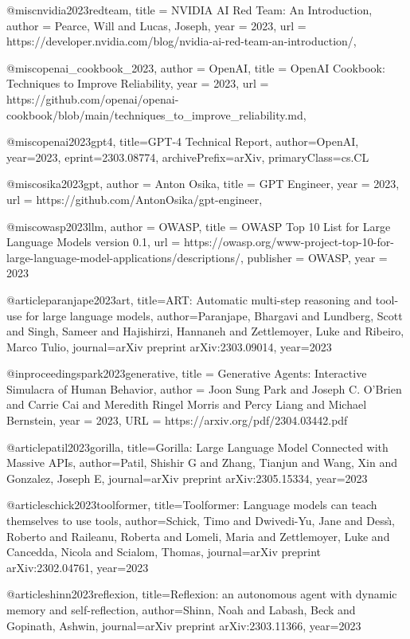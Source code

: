 @misc{nvidia2023redteam,
  title = {NVIDIA AI Red Team: An Introduction},
  author = {Pearce, Will and Lucas, Joseph},
  year = {2023},
  url = {https://developer.nvidia.com/blog/nvidia-ai-red-team-an-introduction/},
}

@misc{openai_cookbook_2023,
  author = {OpenAI},
  title = {OpenAI Cookbook: Techniques to Improve Reliability},
  year = {2023},
  url = {https://github.com/openai/openai-cookbook/blob/main/techniques_to_improve_reliability.md},
}

@misc{openai2023gpt4,
      title={GPT-4 Technical Report},
      author={OpenAI},
      year={2023},
      eprint={2303.08774},
      archivePrefix={arXiv},
      primaryClass={cs.CL}
}

@misc{osika2023gpt,
  author = {Anton Osika},
  title = {GPT Engineer},
  year = {2023},
  url = {https://github.com/AntonOsika/gpt-engineer},
}

@misc{owasp2023llm,
  author = {OWASP},
  title = {OWASP Top 10 List for Large Language Models version 0.1},
  url = {https://owasp.org/www-project-top-10-for-large-language-model-applications/descriptions/},
  publisher = {OWASP},
  year = {2023}
}

@article{paranjape2023art,
  title={ART: Automatic multi-step reasoning and tool-use for large language models},
  author={Paranjape, Bhargavi and Lundberg, Scott and Singh, Sameer and Hajishirzi, Hannaneh and Zettlemoyer, Luke and Ribeiro, Marco Tulio},
  journal={arXiv preprint arXiv:2303.09014},
  year={2023}
}

@inproceedings{park2023generative,
title	= {Generative Agents: Interactive Simulacra of Human Behavior},
author	= {Joon Sung Park and Joseph C. O'Brien and Carrie Cai and Meredith Ringel Morris and Percy Liang and Michael Bernstein},
year	= {2023},
URL	= {https://arxiv.org/pdf/2304.03442.pdf}
}

@article{patil2023gorilla,
  title={Gorilla: Large Language Model Connected with Massive APIs},
  author={Patil, Shishir G and Zhang, Tianjun and Wang, Xin and Gonzalez, Joseph E},
  journal={arXiv preprint arXiv:2305.15334},
  year={2023}
}

@article{schick2023toolformer,
  title={Toolformer: Language models can teach themselves to use tools},
  author={Schick, Timo and Dwivedi-Yu, Jane and Dess{\`\i}, Roberto and Raileanu, Roberta and Lomeli, Maria and Zettlemoyer, Luke and Cancedda, Nicola and Scialom, Thomas},
  journal={arXiv preprint arXiv:2302.04761},
  year={2023}
}

@article{shinn2023reflexion,
  title={Reflexion: an autonomous agent with dynamic memory and self-reflection},
  author={Shinn, Noah and Labash, Beck and Gopinath, Ashwin},
  journal={arXiv preprint arXiv:2303.11366},
  year={2023}
}

